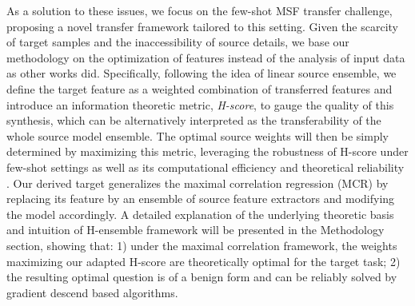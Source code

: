 \documentclass[letterpaper]{article} %
\begin{document}
As a solution to these issues, we focus on the few-shot MSF transfer challenge, proposing a novel transfer framework tailored to this setting. 
Given the scarcity of target samples and the inaccessibility of source details, we base our methodology on the optimization of features instead of the analysis of input data as other works did.
Specifically, following the idea of linear source ensemble, we define the target feature as a weighted combination of transferred features and introduce an information theoretic metric, \textit{H-score}, to gauge the quality of this synthesis, which can be alternatively interpreted as the transferability of the whole source model ensemble. The optimal source weights will then be simply determined by maximizing this metric, leveraging the robustness of H-score under few-shot settings as well as its computational efficiency and theoretical reliability \citep{huang2019information}.
Our derived target generalizes the maximal correlation regression (MCR) by replacing its feature by an ensemble of source feature extractors and modifying the model accordingly.
A detailed explanation of the underlying theoretic basis and intuition of H-ensemble framework will be presented in the Methodology section, showing that: 1) under the maximal correlation framework, the weights maximizing our adapted H-score are theoretically optimal for the target task; 2) the resulting optimal question is of a benign form and can be reliably solved by gradient descend based algorithms.

\end{document}
